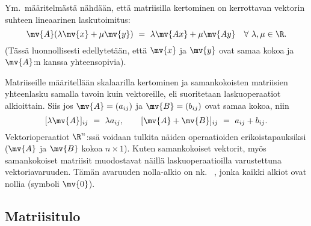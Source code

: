 Ym.\ määritelmästä nähdään, että matriisilla kertominen on kerrottavan vektorin suhteen 
lineaarinen laskutoimitus:
\[ 
\mv{A}(\lambda \mv{x} + \mu \mv{y})\ =\ \lambda \mv{Ax} + \mu \mv{Ay} \quad 
                                               \forall\ \lambda,\mu \in \R.
\]
(Tässä luonnollisesti edellytetään, että $\mv{x}$ ja $\mv{y}$ ovat samaa kokoa ja $\mv{A}$:n 
kanssa yhteensopivia).

Matriiseille määritellään skalaarilla kertominen ja samankokoisten matriisien yhteenlasku 
samalla tavoin kuin vektoreille, eli suoritetaan laskuoperaatiot alkioittain. Siis jos
$\mv{A} = (a_{ij})$ ja $\mv{B} = (b_{ij})$ ovat samaa kokoa, niin
\[ 
[\lambda \mv{A}]_{ij}\ =\ \lambda a_{ij}, \quad\quad [\mv{A}+\mv{B}]_{ij}\ =\ a_{ij} + b_{ij}. 
\]
Vektorioperaatiot $\R^n$:ssä voidaan tulkita näiden operaatioiden erikoistapauksiksi 
($\mv{A}$ ja $\mv{B}$ kokoa $n \times 1$). Kuten samankokoiset vektorit, myös samankokoiset 
matriisit muodostavat näillä laskuoperaatioilla varustettuna vektoriavaruuden. Tämän avaruuden
nolla-alkio on nk.\
%
, jonka kaikki alkiot ovat nollia (symboli $\mv{0}$).

\subsection*{Matriisitulo}

